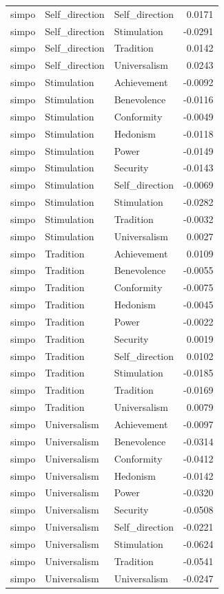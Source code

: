 \begin{tabular}{lllr}
simpo & Self\_direction & Self\_direction & 0.0171 \\
simpo & Self\_direction & Stimulation & -0.0291 \\
simpo & Self\_direction & Tradition & 0.0142 \\
simpo & Self\_direction & Universalism & 0.0243 \\
simpo & Stimulation & Achievement & -0.0092 \\
simpo & Stimulation & Benevolence & -0.0116 \\
simpo & Stimulation & Conformity & -0.0049 \\
simpo & Stimulation & Hedonism & -0.0118 \\
simpo & Stimulation & Power & -0.0149 \\
simpo & Stimulation & Security & -0.0143 \\
simpo & Stimulation & Self\_direction & -0.0069 \\
simpo & Stimulation & Stimulation & -0.0282 \\
simpo & Stimulation & Tradition & -0.0032 \\
simpo & Stimulation & Universalism & 0.0027 \\
simpo & Tradition & Achievement & 0.0109 \\
simpo & Tradition & Benevolence & -0.0055 \\
simpo & Tradition & Conformity & -0.0075 \\
simpo & Tradition & Hedonism & -0.0045 \\
simpo & Tradition & Power & -0.0022 \\
simpo & Tradition & Security & 0.0019 \\
simpo & Tradition & Self\_direction & 0.0102 \\
simpo & Tradition & Stimulation & -0.0185 \\
simpo & Tradition & Tradition & -0.0169 \\
simpo & Tradition & Universalism & 0.0079 \\
simpo & Universalism & Achievement & -0.0097 \\
simpo & Universalism & Benevolence & -0.0314 \\
simpo & Universalism & Conformity & -0.0412 \\
simpo & Universalism & Hedonism & -0.0142 \\
simpo & Universalism & Power & -0.0320 \\
simpo & Universalism & Security & -0.0508 \\
simpo & Universalism & Self\_direction & -0.0221 \\
simpo & Universalism & Stimulation & -0.0624 \\
simpo & Universalism & Tradition & -0.0541 \\
simpo & Universalism & Universalism & -0.0247 \\
\bottomrule
\end{tabular}
